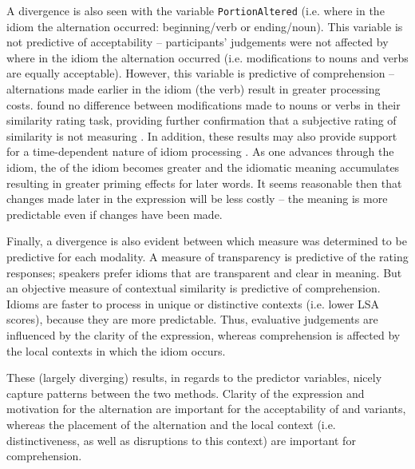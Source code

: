 \documentclass[output=paper
,modfonts
,nonflat]{langsci/langscibook}
\begin{document}
A divergence is also seen with the variable \texttt{PortionAltered} (i.e. where in the idiom the alternation occurred: beginning/verb or ending/noun). This variable is not predictive of acceptability -- participants' judgements were not affected by where in the idiom the alternation occurred (i.e. modifications to nouns and verbs are equally acceptable). However, this variable is predictive of comprehension -- alternations made earlier in the idiom (the verb) result in greater processing costs. \citet{GibbsEtAl1989} found no difference between modifications made to nouns or verbs in their similarity rating task, providing further confirmation that a subjective rating of similarity is not measuring . In addition, these results may also provide support for a time-dependent nature of idiom processing \citep{TitoneLibben2014}. As one advances through the idiom, the  of the idiom becomes greater and the idiomatic meaning accumulates resulting in greater priming effects for later words. It seems reasonable then that changes made later in the expression will be less costly -- the meaning is more predictable even if changes have been made.

Finally, a divergence is also evident between which  measure was determined to be predictive for each modality. A measure of transparency is predictive of the  rating responses; speakers prefer idioms that are transparent and clear in meaning. But an objective measure of contextual similarity is predictive of comprehension. Idioms are faster to process in unique or distinctive contexts (i.e. lower LSA scores), because they are more predictable. Thus, evaluative judgements are influenced by the clarity of the expression, whereas comprehension is affected by the local contexts in which the idiom occurs.

These (largely diverging) results,  in regards to the predictor variables, nicely capture patterns between the two methods. Clarity of the expression and motivation for the alternation are important for the acceptability of  and variants, whereas the placement of the alternation and the local context (i.e. distinctiveness, as well as disruptions to this context) are important for comprehension.
\end{document}
